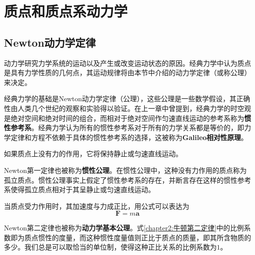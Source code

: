\chapter{质点和质点系动力学}

\section{Newton动力学定律}

动力学研究力学系统的运动以及产生或改变运动状态的原因。经典力学中认为质点是具有力学性质的几何点，其运动规律将由本节中介绍的动力学定律（或称公理）来决定。

经典力学的基础是Newton动力学定律（公理），这些公理是一些数学假设，其正确性由人类几个世纪的观察和实验得以验证。在上一章中曾提到，经典力学的时空观是绝对空间和绝对时间的组合，而相对于绝对空间作匀速直线运动的参考系称为{\bf 惯性参考系}。经典力学认为所有的惯性参考系对于所有的力学关系都是等价的，即力学定律和方程不依赖于具体的惯性参考系的选择，这被称为{\bf Galileo相对性原理}。


\begin{law}[Newton第一定律]
	如果质点上没有力的作用，它将保持静止或匀速直线运动。
\end{law}

Newton第一定律也被称为{\bf 惯性公理}。在惯性公理中，这种没有力作用的质点称为孤立质点。惯性公理事实上假定了惯性参考系的存在，并断言存在这样的惯性参考系使得孤立质点相对于其呈静止或匀速直线运动。


\begin{law}[Newton第二定律]
	当质点受力作用时，其加速度与力成正比，用公式可以表达为
	\begin{equation}
		\boldsymbol{F} = m\boldsymbol{a}
		\label{chapter2:牛顿第二定律}
	\end{equation}
\end{law}

Newton第二定律也被称为{\bf 动力学基本公理}。式\eqref{chapter2:牛顿第二定律}中的比例系数即为质点惯性的度量，而这种惯性度量值则正比于质点的质量，即其所含物质的多少。我们总是可以取恰当的单位制，使得这种正比关系的比例系数为$1$。

